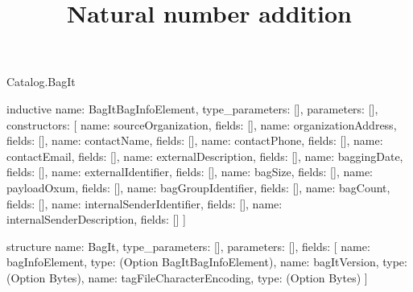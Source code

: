 \begin{lexlean}{Catalog.BagIt}
\title{Natural number addition}
\begin{semanticmodule}
inductive{
  name: BagItBagInfoElement,
  type_parameters: [],
  parameters: [],
  constructors: [
    {name: sourceOrganization, fields: []},
    {name: organizationAddress, fields: []},
    {name: contactName, fields: []},
    {name: contactPhone, fields: []},
    {name: contactEmail, fields: []},
    {name: externalDescription, fields: []},
    {name: baggingDate, fields: []},
    {name: externalIdentifier, fields: []},
    {name: bagSize, fields: []},
    {name: payloadOxum, fields: []},
    {name: bagGroupIdentifier, fields: []},
    {name: bagCount, fields: []},
    {name: internalSenderIdentifier, fields: []},
    {name: internalSenderDescription, fields: []}
  ]
}

structure{
  name: BagIt,
  type_parameters: [],
  parameters: [],
  fields: [
    {name: bagInfoElement, type: (Option BagItBagInfoElement)},
    {name: bagItVersion, type: (Option Bytes)},
    {name: tagFileCharacterEncoding, type: (Option Bytes)}
  ]
}
\end{semanticmodule}
\end{lexlean}
